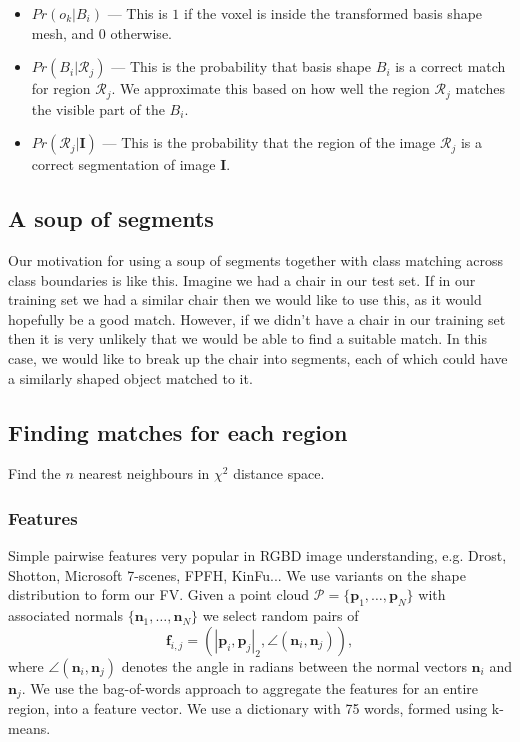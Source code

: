 \documentclass[10pt,a4paper]{article}
\newcommand{\prob}{Pr}
\newcommand{\rgbdimage}{\mathbf{I}}
\newcommand{\imregion}{\mathcal{R}}
\newcommand{\occ}{o}
\newcommand{\basisshape}{B}
\newcommand{\pcloud}{\mathcal{P}}
\newcommand{\point}{\mathbf{p}}
\newcommand{\normal}{\mathbf{n}}
\begin{document}
\begin{itemize}
\item $\prob(\occ_k|\basisshape_i)$ ---
This is $1$ if the voxel is inside the transformed basis shape mesh, and $0$ otherwise.
\item $\prob(\basisshape_i|\imregion_j)$ ---
This is the probability that basis shape $\basisshape_i$ is a correct match for region $\imregion_j$. We approximate this based on how well the region $\imregion_j$ matches the visible part of the $\basisshape_i$.
\item $\prob(\imregion_j|\rgbdimage)$ ---
This is the probability that the region of the image $\imregion_j$ is a correct segmentation of image $\rgbdimage$.
\end{itemize}


\subsection{A soup of segments}

Our motivation for using a soup of segments together with class matching across class boundaries is like this. 
Imagine we had a chair in our test set. If in our training set we had a similar chair then we would like to use this, as it would hopefully be a good match. 
However, if we didn't have a chair in our training set then it is very unlikely that we would be able to find a suitable match. 
In this case, we would like to break up the chair into segments, each of which could have a similarly shaped object matched to it.

\subsection{Finding matches for each region}

Find the $n$ nearest neighbours in $\chi^2$ distance space.

\subsubsection{Features}

Simple pairwise features very popular in RGBD image understanding, e.g. Drost, Shotton, Microsoft 7-scenes, FPFH, KinFu... 
We use variants on the shape distribution \cite{osada-csma-2001} to form our FV. 
Given a point cloud $\pcloud = \{\point_1, \hdots, \point_N\}$ with associated normals $\{\normal_1, \hdots, \normal_N\}$ we select random pairs of 
$$
\mathbf{f}_{i,j} = \left(|\point_i, \point_j|_2, \angle(\normal_i, \normal_j)\right),
$$
where $\angle(\normal_i,\normal_j)$ denotes the angle in radians between the normal vectors $\normal_i$ and $\normal_j$.
We use the bag-of-words approach to aggregate the features for an entire region, into a feature vector. We use a dictionary with 75 words, formed using k-means.
\end{document}
